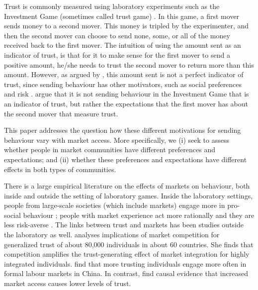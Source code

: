 Trust is commonly measured using laboratory experiments such as the Investment Game (sometimes called trust game) \citep{Berg1995,Glaeser2000b}. In this game, a first mover sends money to a second mover. This money is tripled by the experimenter, and then the second mover can choose to send none, some, or all of the money received back to the first mover. The intuition of using the amount sent as an indicator of trust, is that for it to make sense for the first mover to send a positive amount, he/she needs to trust the second mover to return more than this amount. However, as argued by \cite{Sapienza2013}, this amount sent is not a perfect indicator of trust, since sending behaviour has other motivators, such as social preferences\citep{Ashraf2006,Cox2004} and risk \citep{Karlan2005,Bohnet2004,Bohnet2008}. \cite{Sapienza2013} argue that it is not sending behaviour in the Investment Game that is an indicator of trust, but rather the expectations that the first mover has about the second mover that measure trust.

This paper addresses the question how these different motivations for sending behaviour vary with market access. More specifically, we (i) seek to assess whether people in market communities have different preferences and expectations; and (ii) whether these preferences and expectations have different effects in both types of communities.

There is a large empirical literature on the effects of markets on behaviour, both inside and outside the setting of laboratory games. Inside the laboratory settings, people from large-scale societies (which include markets) engage more in pro-social behaviour \cite{Henrich2005,Henrich2010}; people with market experience act more rationally \citep{List2008,Cecchi2013,Braga2009} and they are less risk-averse \citep{Melesse2015}. The links between trust and markets has been studies outside the laboratory as well. \cite{Fischer2008} analyses implications of market competition for generalized trust of about 80,000 individuals in about 60 countries. She finds that competition amplifies the trust-generating effect of market integration for highly integrated individuals. \cite{Tu2010} find that more trusting individuals engage more often in formal labour markets in China. In contrast,  \cite{Siziba2012} find causal evidence that increased market access causes lower levels of trust.  

